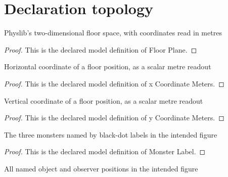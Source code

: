 \section{Declaration topology}
\begin{definition}
  \label{def:physics:phyx-mini-0164:phyxminiproblems-problemphyxmini0164-floorplane}
  Physlib's two-dimensional floor space, with coordinates read in metres
\end{definition}
\begin{proof}
  This is the declared model definition of Floor Plane.
\end{proof}
\begin{definition}
  \label{def:physics:phyx-mini-0164:phyxminiproblems-problemphyxmini0164-xcoordinatemeters}
  Horizontal coordinate of a floor position, as a scalar metre readout
\end{definition}
\begin{proof}
  This is the declared model definition of x Coordinate Meters.
\end{proof}
\begin{definition}
  \label{def:physics:phyx-mini-0164:phyxminiproblems-problemphyxmini0164-ycoordinatemeters}
  Vertical coordinate of a floor position, as a scalar metre readout
\end{definition}
\begin{proof}
  This is the declared model definition of y Coordinate Meters.
\end{proof}
\begin{definition}
  \label{def:physics:phyx-mini-0164:phyxminiproblems-problemphyxmini0164-monsterlabel}
  The three monsters named by black-dot labels in the intended figure
\end{definition}
\begin{proof}
  This is the declared model definition of Monster Label.
\end{proof}
\begin{definition}
  \label{def:physics:phyx-mini-0164:phyxminiproblems-problemphyxmini0164-figurepoint}
  All named object and observer positions in the intended figure
\end{definition}
